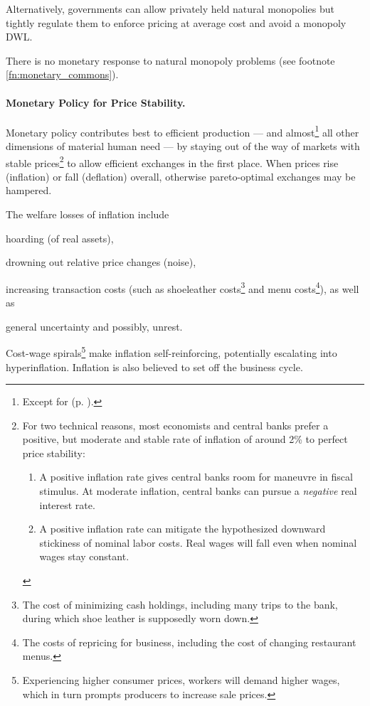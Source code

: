 Alternatively, governments can allow privately held natural monopolies but tightly regulate them to enforce pricing at average cost and avoid a monopoly \gls{DWL}.

There is no monetary response to natural monopoly problems (see footnote \ref{fn:monetary_commons}).

\paragraph{Monetary Policy for Price Stability.}  \label{sec:price_stability} Monetary policy contributes best to efficient production --- and almost\footnote{
	Except for  (p. \pageref{sec:monetary_stimulus}).}
all other dimensions of material human need --- by staying out of the way of markets with stable prices\footnote{
	For two technical reasons, most economists and central banks prefer a positive, but moderate and stable rate of inflation of around 2\% to perfect price stability:
	\begin{enumerate}
		\item A positive inflation rate gives central banks room for maneuvre in fiscal stimulus. At moderate inflation, central banks can pursue a \emph{negative} real interest rate. 
		\item A positive inflation rate can mitigate the hypothesized downward stickiness of nominal labor costs. Real wages will fall even when nominal wages stay constant.%
	\end{enumerate}} 
to allow efficient exchanges in the first place. When prices rise (inflation) or fall (deflation) overall, otherwise pareto-optimal exchanges may be hampered. 

The welfare losses of inflation include \begin{inparaenum}
	\item hoarding (of real assets), 
	\item drowning out relative price changes (noise), 
	\item increasing transaction costs (such as shoeleather costs\footnote{
		The cost of minimizing cash holdings, including many trips to the bank, during which shoe leather is supposedly worn down.} 
		and menu costs\footnote{
			The costs of repricing for business, including the cost of changing restaurant menus.}), as well as 
	\item general uncertainty and possibly, unrest. 
	\end{inparaenum}
Cost-wage spirals\footnote{Experiencing higher consumer prices, workers will demand higher wages, which in turn prompts producers to increase sale prices.} make inflation self-reinforcing, potentially escalating into hyperinflation. Inflation is also believed to set off the business cycle. %

